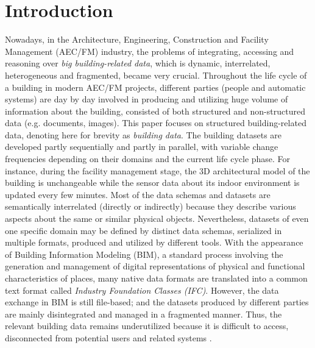 \section{Introduction}\label{introduction}



Nowadays, in the Architecture, Engineering, Construction and Facility Management (AEC/FM) industry, the problems of integrating, accessing and reasoning over \emph{big building-related data}, which is dynamic, interrelated, heterogeneous and fragmented, became very crucial.
Throughout the life cycle of a building in modern AEC/FM projects, different parties (people and automatic systems) are day by day involved in producing and utilizing huge volume of information about the building, consisted of both structured and non-structured data (e.g. documents, images).
This paper focuses on structured building-related data, denoting here for brevity as \emph{building data}.
The building datasets are developed partly sequentially and partly in parallel, with variable change frequencies depending on their domains and the current life cycle phase.
For instance, during the facility management stage, the 3D architectural model of the building is unchangeable while the sensor data about its indoor environment is updated every few minutes.
Most of the data schemas and datasets are semantically interrelated (directly or indirectly) because they describe various aspects about the same or similar physical objects.
Nevertheless, datasets of even one specific domain may be defined by distinct data schemas, serialized in multiple formats, produced and utilized by different tools.
With the appearance of Building Information Modeling (BIM), a standard process involving the generation and management of digital representations of physical and functional characteristics of places, many native data formats are translated into a common text format called \emph{Industry Foundation Classes (IFC)}.
However, the data exchange in BIM is still file-based; and the datasets produced by different parties are mainly disintegrated and managed in a fragmented manner.
Thus, the relevant building data remains underutilized because it is difficult to access, disconnected from potential users and related systems \cite{torma2012distributed}.




